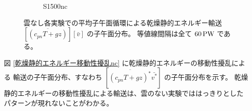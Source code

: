 \documentclass[body]{subfiles}
\begin{document}
\begin{figure}[t]
\begin{subfigure}{.4\textwidth}
		\caption{S1500nc}\label{乾燥静的エネルギー平均子午面循環S1500nc}
	\end{subfigure}
	\caption[雲なし各実験での平均子午面循環による乾燥静的エネルギー輸送の子午面分布]{
		雲なし各実験での平均子午面循環による乾燥静的エネルギー輸送 \([\overline{(c_{pn}T+gz)}][\bar v]\) の子午面分布。
		等値線間隔は全て \(60\hmu{PW}\) である。
	}\label{乾燥静的エネルギー平均子午面循環nc}
\end{figure}

図 \ref{乾燥静的エネルギー移動性擾乱nc} に乾燥静的エネルギーの移動性擾乱による
輸送の子午面分布、すなわち \([\overline{(c_{pn}T+gz)^*}\bar{v^*}]\) の子午面分布を示す。
乾燥静的エネルギーの移動性擾乱による輸送は、雲のない実験でははっきりとした
パターンが現れないことがわかる。

\afterpage{\clearpage}
\end{document}
